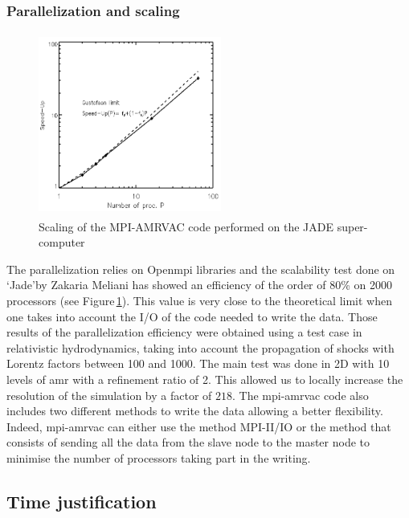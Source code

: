 \documentclass[
    a4paper, 
    12pt, onecolumn,
]{article}
\begin{document}
\subsubsection*{Parallelization and scaling}
\begin{figure}
\vspace*{-60pt}
\includegraphics[height=6cm, width=6cm]{scaling_1}
\caption{Scaling of the MPI-AMRVAC code performed on the JADE super-computer}
\label{fig:scaling_JADE}
\end{figure} 
\indent \indent The parallelization relies on Open{\sc mpi} libraries and the scalability test done on \lq Jade\rq  by Zakaria M{\sc eliani} has showed an efficiency of the order of 80\% on 2000 processors (see Figure\,\ref{fig:scaling_JADE}). This value is very close to the theoretical limit when one takes into account the I/O of the code needed to write the data. Those results of the parallelization efficiency were obtained using a test case in relativistic hydrodynamics, taking into account the propagation of shocks with Lorentz factors between 100 and 1000. The main test was done in 2D with 10 levels of {\sc amr} with a refinement ratio of 2. This allowed us to locally increase the resolution of the simulation by a factor of $218$. The {\sc mpi-amrvac} code also includes two different methods to write the data allowing a better flexibility. Indeed, {\sc mpi-amrvac} can either use the method  MPI-II/IO or the method that consists of sending all the data from the slave node to the master node to minimise the number of processors taking part in the writing.

\subsection{Time justification}
\end{document}
